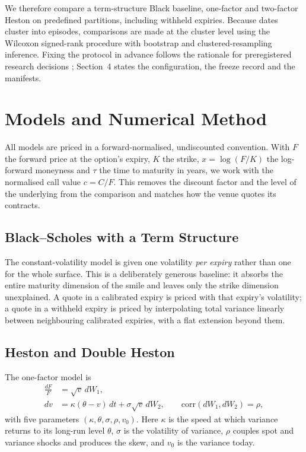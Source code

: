 \documentclass[runningheads]{llncs}
\begin{document}
We therefore compare a term-structure Black baseline, one-factor and two-factor
Heston on predefined partitions, including withheld expiries. Because dates
cluster into episodes, comparisons are made at the cluster level using the
Wilcoxon signed-rank procedure \cite{wilcoxon1945} with bootstrap
\cite{efron1979} and clustered-resampling \cite{cameron2008} inference. Fixing
the protocol in advance follows the rationale for preregistered research
decisions \cite{nosek2018}; Section~4 states the configuration, the freeze
record and the manifests.

\section{Models and Numerical Method}

All models are priced in a forward-normalised, undiscounted convention. With
$F$ the forward price at the option's expiry, $K$ the strike,
$x=\log(F/K)$ the log-forward moneyness and $\tau$ the time to maturity in
years, we work with the normalised call value $c = C/F$. This removes the
discount factor and the level of the underlying from the comparison and matches
how the venue quotes its contracts.

\subsection{Black--Scholes with a Term Structure}

The constant-volatility model is given one volatility \emph{per expiry} rather
than one for the whole surface. This is a deliberately generous baseline: it
absorbs the entire maturity dimension of the smile and leaves only the strike
dimension unexplained. A quote in a calibrated expiry is priced with that
expiry's volatility; a quote in a withheld expiry is priced by interpolating
total variance linearly between neighbouring calibrated expiries, with a flat
extension beyond them.

\subsection{Heston and Double Heston}

The one-factor model is
\begin{align}
\frac{dF}{F} &= \sqrt{v}\,dW_1, \\
dv &= \kappa(\theta - v)\,dt + \sigma\sqrt{v}\,dW_2,
\qquad \mathrm{corr}(dW_1,dW_2)=\rho,
\end{align}
with five parameters $(\kappa,\theta,\sigma,\rho,v_0)$. Here $\kappa$ is the
speed at which variance returns to its long-run level $\theta$, $\sigma$ is the
volatility of variance, $\rho$ couples spot and variance shocks and produces
the skew, and $v_0$ is the variance today.
\end{document}
